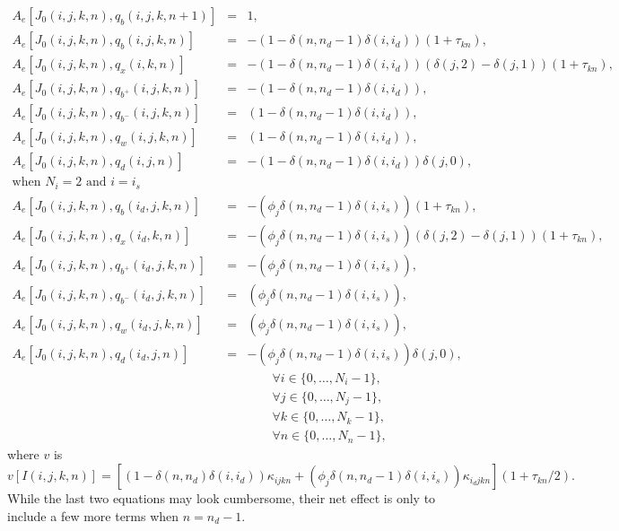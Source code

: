 \documentclass{article}[fleqn,12pt]
\begin{document}
\begin{eqnarray}
        \label{Eq:B2}
        A_e[J_0(i, j, k, n), q_b(i, j, k, n+1)] &=& 1, \nonumber \\
        A_e[J_0(i, j, k, n), q_b(i, j, k, n)] &=& - (1 - \delta(n, n_d-1)\delta(i, i_d))
                (1 + \tau_{kn}), \nonumber \\
        A_e[J_0(i, j, k, n), q_x(i, k, n)] &=& - (1 - \delta(n, n_d-1)\delta(i, i_d))
                (\delta(j, 2) - \delta(j, 1))
                (1 + \tau_{kn}), \nonumber \\
        A_e[J_0(i, j, k, n), q_{b^+}(i, j, k, n)] &=& - (1 - \delta(n, n_d-1)\delta(i, i_d)),
                \nonumber \\
	A_e[J_0(i, j, k, n), q_{b^-}(i, j, k, n)] &=&  (1 - \delta(n, n_d-1)\delta(i, i_d)),
                \nonumber \\
        A_e[J_0(i, j, k, n), q_w(i, j, k, n)] &=& (1 - \delta(n, n_d-1)\delta(i, i_d)), \nonumber \\
        A_e[J_0(i, j, k, n), q_d(i, j, n)] &=& - (1 - \delta(n, n_d-1)\delta(i, i_d))
                \delta(j, 0), \nonumber \\
		\text{when $N_i =2$ and $i = i_s$} && \nonumber\\
        A_e[J_0(i, j, k, n), q_b(i_d, j, k, n)] &=& - (\phi_j\delta(n, n_d-1)\delta(i, i_s))
                (1 + \tau_{kn}), \nonumber \\
        A_e[J_0(i, j, k, n), q_x(i_d, k, n)] &=& - (\phi_j\delta(n, n_d-1)\delta(i, i_s))
                (\delta(j, 2) - \delta(j, 1))
                (1 + \tau_{kn}), \nonumber \\
        A_e[J_0(i, j, k, n), q_{b^+}(i_d, j, k, n)] &=& - (\phi_j\delta(n, n_d-1)\delta(i, i_s)),
                \nonumber \\
        A_e[J_0(i, j, k, n), q_{b^-}(i_d, j, k, n)] &=& (\phi_j\delta(n, n_d-1)\delta(i, i_s)),
                \nonumber \\
        A_e[J_0(i, j, k, n), q_w(i_d, j, k, n)] &=& (\phi_j\delta(n, n_d-1)\delta(i, i_s)),
                \nonumber \\
        A_e[J_0(i, j, k, n), q_d(i_d, j, n)] &=&  -(\phi_j\delta(n, n_d-1)\delta(i, i_s))
                \delta(j, 0), \nonumber \\
        &&\qquad\forall i \in \{0,\ldots, N_i-1\},\nonumber\\
        &&\qquad\forall j \in \{0,\ldots, N_j-1\},\nonumber\\
        &&\qquad\forall k \in \{0,\ldots, N_k-1\},\nonumber\\
        &&\qquad\forall n \in \{0,\ldots, N_n-1\}, \nonumber
\end{eqnarray}
where $v$ is
\begin{equation}
	v[I(i, j, k, n)] 
	= [(1 - \delta(n, n_d)\delta(i, i_d))
	\kappa_{ijkn} + (\phi_j\delta(n, n_d-1)\delta(i, i_s))\kappa_{i_djkn}](1 + \tau_{kn}/2). 
\end{equation}
While the last two equations may look cumbersome, their net effect is only to include
a few more terms when $n=n_d-1$. 
\end{document}

